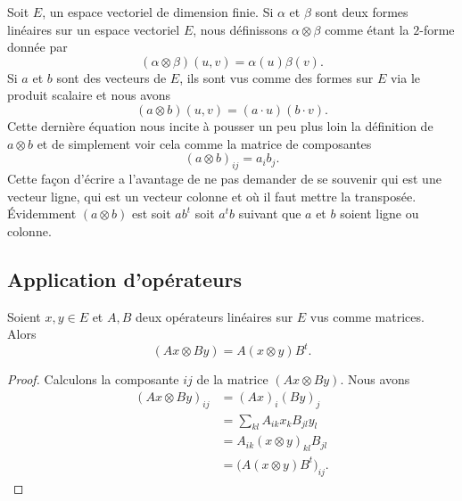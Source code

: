 Soit \( E\), un espace vectoriel de dimension finie. Si \( \alpha\) et \( \beta\) sont deux formes linéaires sur un espace vectoriel \( E\), nous définissons \( \alpha\otimes \beta\) comme étant la \( 2\)-forme donnée par
\begin{equation}
    (\alpha\otimes \beta)(u,v)=\alpha(u)\beta(v).
\end{equation}
Si \( a\) et \( b\) sont des vecteurs de \( E\), ils sont vus comme des formes sur \( E\) via le produit scalaire et nous avons
\begin{equation}
    (a\otimes b)(u,v)=(a\cdot u)(b\cdot v).
\end{equation}
Cette dernière équation nous incite à pousser un peu plus loin la définition de \( a\otimes b\) et de simplement voir cela comme la matrice de composantes
\begin{equation}
    (a\otimes b)_{ij}=a_ib_j.
\end{equation}
Cette façon d'écrire a l'avantage de ne pas demander de se souvenir qui est une vecteur ligne, qui est un vecteur colonne et où il faut mettre la transposée. Évidemment \( (a\otimes b)\) est soit \( ab^t\) soit \( a^tb\) suivant que \( a\) et \( b\) soient ligne ou colonne.

\subsection{Application d'opérateurs}

\begin{lemma}   \label{LemMyKPzY}
    Soient \( x,y\in E\) et \( A,B\) deux opérateurs linéaires sur \( E\) vus comme matrices. Alors
    \begin{equation}        \label{EqXdxvSu}
        (Ax\otimes By)=A(x\otimes y)B^t.
    \end{equation}
\end{lemma}

\begin{proof}
    Calculons la composante \( ij\) de la matrice \( (Ax\otimes By)\). Nous avons
    \begin{subequations}
        \begin{align}
            (Ax\otimes By)_{ij}&=(Ax)_i(By)_j\\
            &=\sum_{kl}A_{ik}x_kB_{jl}y_l\\
            &=A_{ik}(x\otimes y)_{kl}B_{jl}\\
            &=\big( A(x\otimes y)B^t \big)_{ij}.
        \end{align}
    \end{subequations}
\end{proof}

